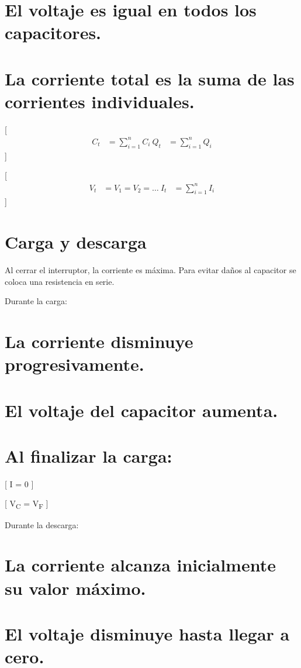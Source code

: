 \documentclass[11pt]{article}
\begin{document}
\section{El voltaje es igual en todos los capacitores.}
\label{sec:orgfb239f5}
\section{La corriente total es la suma de las corrientes individuales.}
\label{sec:org01db1ed}

[
\begin{align}
C_t &= \sum_{i=1}^{n}C_i \
Q_t &= \sum_{i=1}^{n}Q_i
\end{align}
]

[
\begin{align}
V_t &= V_1 = V_2 = \dots \
I_t &= \sum_{i=1}^{n}I_i
\end{align}
]

\section{Carga y descarga}
\label{sec:org31babf9}

Al cerrar el interruptor, la corriente es máxima. Para evitar daños al capacitor se coloca una resistencia en serie.

Durante la carga:

\section{La corriente disminuye progresivamente.}
\label{sec:orgb70d2fc}
\section{El voltaje del capacitor aumenta.}
\label{sec:org72feab6}
\section{Al finalizar la carga:}
\label{sec:orgb16f001}

[
I = 0
]

[
V\textsubscript{C} = V\textsubscript{F}
]

Durante la descarga:

\section{La corriente alcanza inicialmente su valor máximo.}
\label{sec:org97e7265}
\section{El voltaje disminuye hasta llegar a cero.}
\label{sec:org804e5fe}
\end{document}
